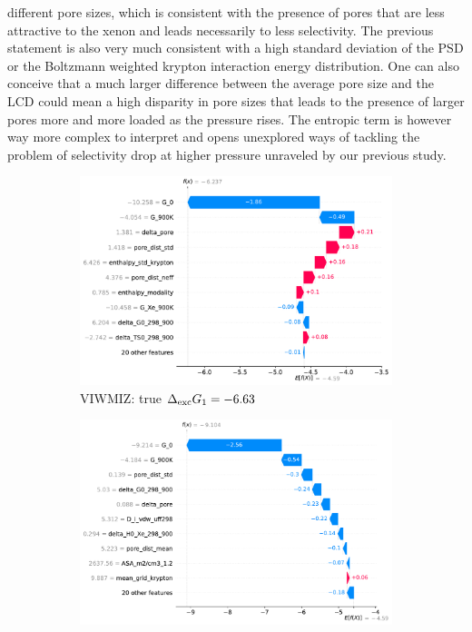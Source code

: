 \documentclass[main]{subfiles}
\begin{document}
different pore sizes, which is consistent with the presence of pores that are less attractive to the xenon and leads necessarily to less selectivity. The previous statement is also very much consistent with a high standard deviation of the PSD or the Boltzmann weighted krypton interaction energy distribution. One can also conceive that a much larger difference between the average pore size and the LCD could mean a high disparity in pore sizes that leads to the presence of larger pores more and more loaded as the pressure rises.
The entropic term is however way more complex to interpret and opens unexplored ways of tackling the problem of selectivity drop at higher pressure unraveled by our previous study\autocite{Ren_2021}.

\begin{figure}[ht]
    \centering
    \begin{subfigure}[b]{0.47\textwidth}
      \centering
      \includegraphics[width=\textwidth]{figures/4-ml/main/VIWMIZ_clean.pdf}
      \caption{VIWMIZ: true $\Delta_{\text{exc}} G_1=-6.63$}
    \end{subfigure}
         \hfill
    \begin{subfigure}[b]{0.47\textwidth}
      \centering
      \includegraphics[width=\textwidth]{figures/4-ml/main/BIMDIL_clean.pdf}

\end{subfigure}
\end{figure}
\end{document}
